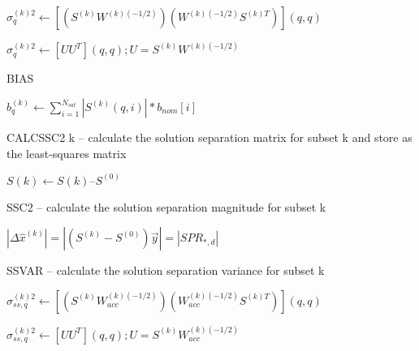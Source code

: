 \documentclass[11pt]{article}
\begin{document}
$\sigma_q^{(k)2} \leftarrow [(S^{(k)}W^{(k)(-1/2)})(W^{(k)(-1/2)}S^{(k)T})](q,q)$

$\sigma_q^{(k)2} \leftarrow [U U^T](q,q); U = S^{(k)}W^{(k)(-1/2)}$

BIAS

$b_q^{(k)} \leftarrow \sum_{i=1}^{N_{sat}}|S^{(k)}(q,i)|*b_{nom}[i]$

CALCSSC2 k – calculate the solution separation matrix for subset k and store as the least-squares matrix

$S{(k)}\leftarrow S{(k)} – S^{(0)}$

SSC2 – calculate the solution separation magnitude for subset k

$ |\Delta \hat{x}^{(k)}| = |(S^{(k)} - S^{(0)})\vec{y}| = |SPR_{*,d}|$

SSVAR – calculate the solution separation variance for subset k

$\sigma_{ss,q}^{(k)2} \leftarrow [(S^{(k)}W_{acc}^{(k)(-1/2)})(W_{acc}^{(k)(-1/2)}S^{(k)T})](q,q)$

$\sigma_{ss,q}^{(k)2} \leftarrow [U U^T](q,q); U = S^{(k)}W_{acc}^{(k)(-1/2)}$
\end{document}
